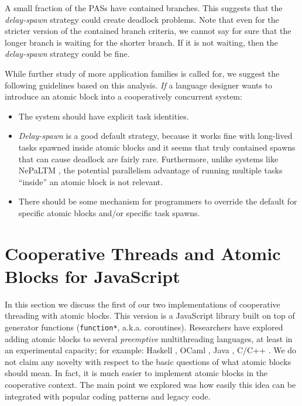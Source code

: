 \documentclass[acmsmall,anonymous,review]{acmart}\settopmatter{printfolios=true,printccs=false,printacmref=false}
\begin{document}
A small fraction of the PASs have contained branches.
This suggests that the \emph{delay-spawn} strategy could create deadlock problems.
Note that even for the stricter version of the contained branch criteria, we cannot say for sure that the longer branch is waiting for the shorter branch.
If it is not waiting, then the \emph{delay-spawn} strategy could be fine.


While further study of more application families is called for, we suggest the following guidelines based on this analysis.
\emph{If} a language designer wants to introduce an atomic block into a cooperatively concurrent system:
\begin{itemize}
\item The system should have explicit task identities.
\item \emph{Delay-spawn} is a good default strategy, because it works fine with long-lived tasks spawned inside atomic blocks and it seems that truly contained spawns that can cause deadlock are fairly rare.
  Furthermore, unlike systems like NePaLTM \cite{Volos2009}, the potential parallelism advantage of running multiple tasks ``inside'' an atomic block is not relevant.
\item There should be some mechanism for programmers to override the default for specific atomic blocks and/or specific task spawns.
\end{itemize}

\section{Cooperative Threads and Atomic Blocks for JavaScript}

In this section we discuss the first of our two implementations of cooperative threading with atomic blocks.
This version is a JavaScript library built on top of generator functions (\texttt{function*}, a.k.a. coroutines).
Researchers have explored adding atomic blocks to several \emph{preemptive} multithreading languages, at least in an experimental capacity; for example: Haskell \cite{Harris2005}, OCaml \cite{Ringenburg2005}, Java \cite{Herlihy2006}, C/C++ \cite{Ni2008}.
We do not claim any novelty with respect to the basic questions of what atomic blocks should mean.
In fact, it is much easier to implement atomic blocks in the cooperative context.
The main point we explored was how easily this idea can be integrated with popular coding patterns and legacy code.
\end{document}
